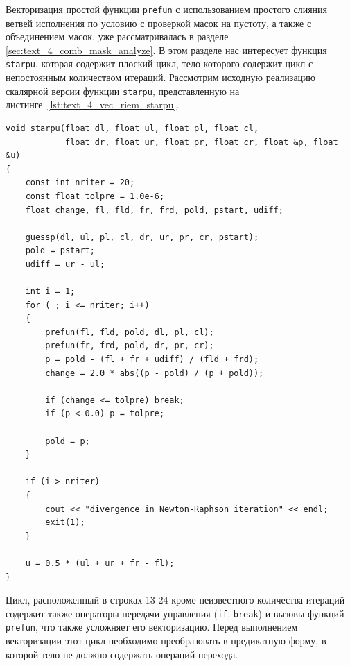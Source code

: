 Векторизация простой функции \texttt{prefun} с использованием простого слияния ветвей исполнения по условию с проверкой масок на пустоту, а также с объединением масок, уже рассматривалась в разделе \ref{sec:text_4_comb_mask_analyze}.
В этом разделе нас интересует функция \texttt{starpu}, которая содержит плоский цикл, тело которого содержит цикл с непостоянным количеством итераций.
Рассмотрим исходную реализацию скалярной версии функции \texttt{starpu}, представленную на листинге~\ref{lst:text_4_vec_riem_starpu}.

\begin{lstlisting}[caption={Оригинальная версия функции \texttt{starpu}.},label={lst:text_4_vec_riem_starpu}]
void starpu(float dl, float ul, float pl, float cl,
            float dr, float ur, float pr, float cr, float &p, float &u)
{
    const int nriter = 20;
    const float tolpre = 1.0e-6;
    float change, fl, fld, fr, frd, pold, pstart, udiff;

    guessp(dl, ul, pl, cl, dr, ur, pr, cr, pstart);
    pold = pstart;
    udiff = ur - ul;

    int i = 1;
    for ( ; i <= nriter; i++)
    {
        prefun(fl, fld, pold, dl, pl, cl);
        prefun(fr, frd, pold, dr, pr, cr);
        p = pold - (fl + fr + udiff) / (fld + frd);
        change = 2.0 * abs((p - pold) / (p + pold));

        if (change <= tolpre) break;
        if (p < 0.0) p = tolpre;

        pold = p;
    }

    if (i > nriter)
    {
        cout << "divergence in Newton-Raphson iteration" << endl;
        exit(1);
    }

    u = 0.5 * (ul + ur + fr - fl);
}
\end{lstlisting}

Цикл, расположенный в строках 13-24 кроме неизвестного количества итераций содержит также операторы передачи управления (\texttt{if}, \texttt{break}) и вызовы функций \texttt{prefun}, что также усложняет его векторизацию.
Перед выполнением векторизации этот цикл необходимо преобразовать в предикатную форму, в которой тело не должно содержать операций перехода.

